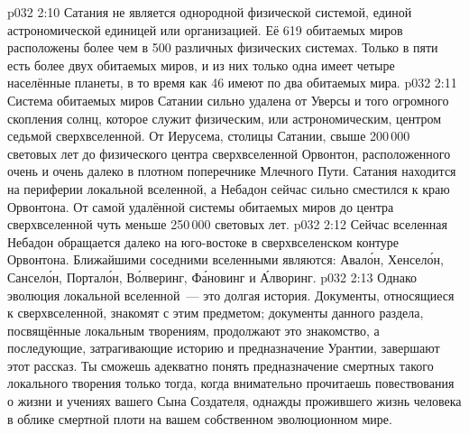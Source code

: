 \vs p032 2:10 Сатания не является однородной физической системой, единой астрономической единицей или организацией. Её 619 обитаемых миров расположены более чем в 500 различных физических системах. Только в пяти есть более двух обитаемых миров, и из них только одна имеет четыре населённые планеты, в то время как 46 имеют по два обитаемых мира.
\vs p032 2:11 Система обитаемых миров Сатании сильно удалена от Уверсы и того огромного скопления солнц, которое служит физическим, или астрономическим, центром седьмой сверхвселенной. От Иерусема, столицы Сатании, свыше 200\,000 световых лет до физического центра сверхвселенной Орвонтон, расположенного очень и очень далеко в плотном поперечнике Млечного Пути. Сатания находится на периферии локальной вселенной, а Небадон сейчас сильно сместился к краю Орвонтона. От самой удалённой системы обитаемых миров до центра сверхвселенной чуть меньше 250\,000 световых лет.
\vs p032 2:12 Сейчас вселенная Небадон обращается далеко на юго\hyp{}востоке в сверхвселенском контуре Орвонтона. Ближайшими соседними вселенными являются: Авал\'он, Хенсел\'он, Сансел\'он, Портал\'он, В\'олверинг, Ф\'ановинг и \'Алворинг.
\vs p032 2:13 \pc Однако эволюция локальной вселенной~--- это долгая история. Документы, относящиеся к сверхвселенной, знакомят с этим предметом; документы данного раздела, посвящённые локальным творениям, продолжают это знакомство, а последующие, затрагивающие историю и предназначение Урантии, завершают этот рассказ. Ты сможешь адекватно понять предназначение смертных такого локального творения только тогда, когда внимательно прочитаешь повествования о жизни и учениях вашего Сына Создателя, однажды прожившего жизнь человека в облике смертной плоти на вашем собственном эволюционном мире.
